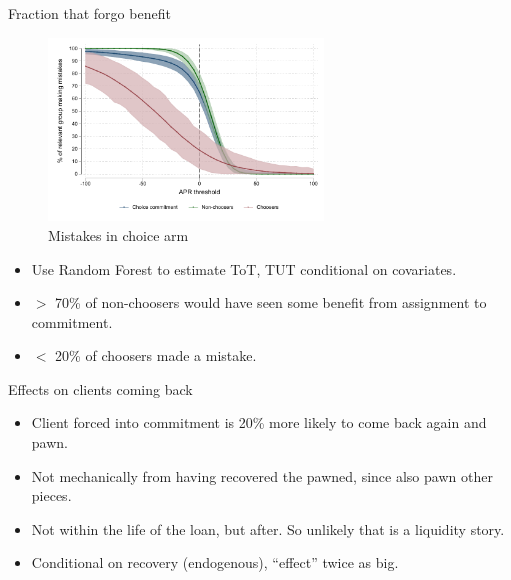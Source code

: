 \documentclass[8pt]{beamer}
\begin{document}






\begin{frame}{Fraction that forgo benefit}


    \label{choose_wrong}
    
        \begin{figure}{\textwidth}
        \caption{Mistakes in choice arm}
        \centering
        \includegraphics[width=0.65\textwidth]{Figuras/line_cw_apr_tot_tut.pdf}
        \end{figure}

\begin{itemize}
    \item   Use Random Forest to estimate ToT, TUT conditional on covariates.
    \item $>$ 70\% of non-choosers would have seen some benefit from assignment to commitment.
    \item  $<$ 20\% of choosers made a mistake.
\end{itemize}        


\end{frame}







\begin{frame}{Effects on clients coming back}

\begin{itemize}
    \item Client forced into commitment is 20\% more likely to come back again and pawn.
    \item Not mechanically from having recovered the pawned, since also pawn other pieces.
    \item Not within the life of the loan, but after. So unlikely that is a liquidity story.
    \item Conditional on recovery (endogenous), ``effect'' twice as big.
\end{itemize}

\vspace{.2in}
\begin{table}[H]
\begin{center}
\footnotesize{}
\end{center}
\end{table}    
\end{frame}
\end{document}
